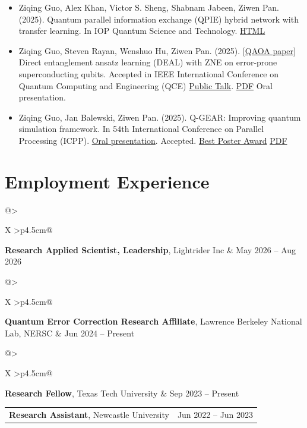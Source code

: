 \documentclass[10pt, letterpaper]{article}
\makeatletter
\newenvironment{bulletentries}{%
    \begin{itemize}[topsep=0.10cm, parsep=0.10cm, partopsep=0pt, itemsep=0pt,
                    leftmargin=10pt]
}{%
    \end{itemize}%
}
\newcommand{\datedentry}[2]{%
    \begin{tabularx}{\linewidth}{@{}>{\raggedright\arraybackslash}X
                                  >{\raggedleft\arraybackslash}p{4.5cm}@{}}
        #1 & #2
    \end{tabularx}%
}
\newcommand{\tealhref}[2]{\href{#1}{\textcolor{linkcolor}{#2}}}
\makeatother
\begin{document}
\begin{bulletentries}
\item Ziqing Guo, Alex Khan, Victor S. Sheng, Shabnam Jabeen, Ziwen Pan. (2025).
      Quantum parallel information exchange (QPIE) hybrid network with transfer
      learning. In IOP Quantum Science and Technology.
      \href{https://iopscience.iop.org/article/10.1088/2058-9565/ade89f}{HTML}
\item Ziqing Guo, Steven Rayan, Wenshuo Hu, Ziwen Pan. (2025).
      [\tealhref{https://github.com/gzquse/DEAL_QUBO}{QAOA paper}] Direct
      entanglement ansatz learning (DEAL) with ZNE on error-prone
      superconducting qubits. Accepted in IEEE International Conference on
      Quantum Computing and Engineering (QCE)
      \tealhref{https://www.youtube.com/watch?v=FQ0yvO-82IA}{Public Talk}.
      \href{https://arxiv.org/pdf/2504.04021}{PDF} Oral presentation.
\item Ziqing Guo, Jan Balewski, Ziwen Pan. (2025). Q-GEAR: Improving quantum
      simulation framework. In 54th International Conference on Parallel
      Processing (ICPP).
      \tealhref{https://ssl.linklings.net/conferences/icpp/icpp2025_proceedings/views/at_a_glance.html}{Oral presentation}.
      Accepted.
      \tealhref{https://drive.google.com/drive/folders/1G_AqgbxvtGS_LbnAqlTEVEZeR1Xt8x46?usp=sharing}{Best Poster Award}
      \href{https://arxiv.org/pdf/2504.03967}{PDF}
\end{bulletentries}

\section{Employment Experience}

\datedentry{\textbf{Research Applied Scientist, Leadership}, Lightrider Inc}{May 2026 -- Aug 2026}

\vspace{0.2cm}
\datedentry{\textbf{Quantum Error Correction Research Affiliate}, Lawrence Berkeley National Lab, NERSC}{Jun 2024 -- Present}

\vspace{0.2cm}
\datedentry{\textbf{Research Fellow}, Texas Tech University}{Sep 2023 -- Present}

\vspace{0.2cm}
\datedentry{\textbf{Research Assistant}, Newcastle University}{Jun 2022 -- Jun 2023}
\end{document}
